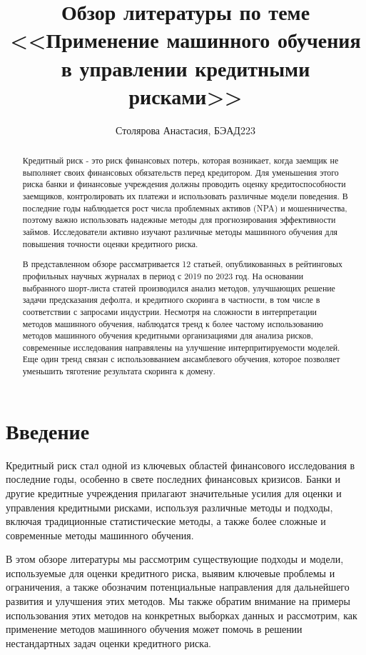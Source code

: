 \documentclass[14pt, letterpaper, twoside]{extarticle}
\title{Обзор литературы по теме <<Применение машинного обучения в  управлении кредитными рисками>>}
\author{Столярова Анастасия, БЭАД223}
\begin{document}
\maketitle

\begin{abstract}
\indent 
Кредитный риск - это риск финансовых потерь, которая возникает, когда заемщик не выполняет своих финансовых обязательств перед кредитором. Для уменьшения этого риска банки и финансовые учреждения должны проводить оценку кредитоспособности заемщиков, контролировать их платежи и использовать различные модели поведения. В последние годы наблюдается рост числа проблемных активов (NPA) и мошенничества, поэтому важно использовать надежные методы для прогнозирования эффективности займов. Исследователи активно изучают различные методы машинного обучения для повышения точности оценки кредитного риска.

\indent В представленном обзоре рассматривается 12 статьей, опубликованных в рейтинговых профильных научных журналах в период с 2019 по 2023 год. На основании выбранного шорт-листа статей производился анализ методов, улучшающих решение задачи предсказания дефолта, и кредитного скоринга в частности, в том числе в соответствии с запросами индустрии. Несмотря на сложности в интерпретации методов машинного обучения, наблюдатся тренд к более частому использованию методов машинного обучения кредитными организациями для анализа рисков, современные исследования направялены на улучшение интерпритируемости моделей. Еще один тренд связан с использовванием ансамблевого обучения, которое позволяет уменьшить тяготение результата скоринга к домену.
\end{abstract}


\section{Введение}
 Кредитный риск стал одной из ключевых областей финансового исследования в последние годы, особенно в свете последних финансовых кризисов. Банки и другие кредитные учреждения прилагают значительные усилия для оценки и управления кредитными рисками, используя различные методы и подходы, включая традиционные статистические методы, а также более сложные и современные методы машинного обучения.

В этом обзоре литературы мы рассмотрим существующие подходы и модели, используемые для оценки кредитного риска, выявим ключевые проблемы и ограничения, а также обозначим потенциальные направления для дальнейшего развития и улучшения этих методов. Мы также обратим внимание на примеры использования этих методов на конкретных выборках данных и рассмотрим, как применение методов машинного обучения может помочь в решении нестандартных задач оценки кредитного риска.
\end{document}
